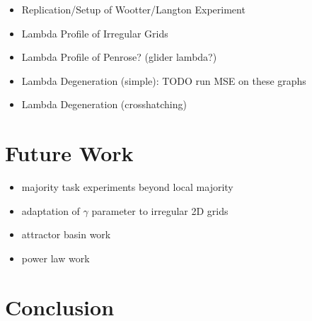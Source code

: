 \documentclass[a4paper,11pt]{report}
\begin{document}
\begin{itemize}
\item Replication/Setup of Wootter/Langton Experiment
\item Lambda Profile of Irregular Grids
\item Lambda Profile of Penrose? (glider lambda?)
\item Lambda Degeneration (simple): TODO run MSE on these graphs
\item Lambda Degeneration (crosshatching)
\end{itemize}

\chapter{Future Work}
\label{ch:future_work}

\begin{itemize}

\item majority task experiments beyond local majority
\item adaptation of $\gamma$ parameter to irregular 2D grids
\item attractor basin work
\item power law work

\end{itemize}

\chapter{Conclusion}
\label{ch:conclusion}
\end{document}
